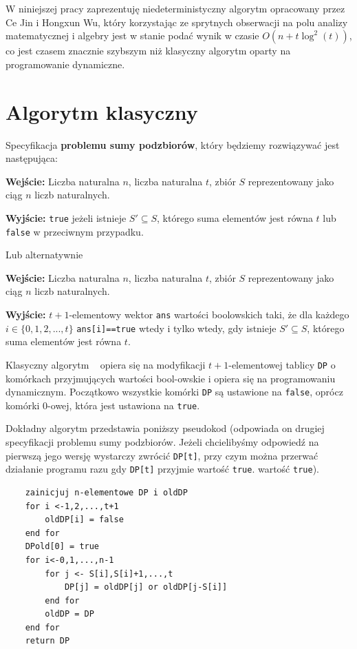 \documentclass{article}
\begin{document}
W niniejszej pracy zaprezentuję niedeterministyczny algorytm opracowany przez Ce Jin 
i Hongxun Wu, który korzystając ze sprytnych obserwacji na polu analizy matematycznej i algebry jest w 
stanie podać wynik w czasie $O(n+t\log^2(t))$, co jest czasem znacznie szybszym niż klasyczny algorytm 
oparty na programowanie dynamiczne. 



\section{Algorytm klasyczny}
Specyfikacja \textbf{problemu sumy podzbiorów}, który będziemy rozwiązywać jest następująca:

\begin{tcolorbox}
    \textbf{Wejście:} Liczba naturalna $n$, liczba naturalna $t$, zbiór $S$ reprezentowany jako ciąg $n$ liczb naturalnych.
    
    \textbf{Wyjście:} \texttt{true} jeżeli istnieje $S' \subseteq S$, którego suma elementów jest równa $t$ lub 
    \texttt{false} w przeciwnym przypadku.
\end{tcolorbox}
Lub alternatywnie
\begin{tcolorbox}
    \textbf{Wejście:} Liczba naturalna $n$, liczba naturalna $t$, zbiór $S$ reprezentowany jako ciąg $n$ liczb naturalnych.
    
    \textbf{Wyjście:} $t+1$-elementowy wektor \texttt{ans} wartości boolowskich taki, że dla każdego
    $i \in \{0,1,2,...,t\}$ \texttt{ans[i]==true} wtedy i tylko wtedy, gdy
    istnieje $S' \subseteq S$, którego suma elementów jest równa $t$.
\end{tcolorbox}


Klasyczny algorytm ~\cite{martello1984mixture} opiera się na modyfikacji $t+1$-elementowej tablicy \texttt{DP} o komórkach przyjmujących wartości bool-owskie i 
opiera się na programowaniu dynamicznym. Początkowo wszystkie komórki \texttt{DP} są ustawione na \texttt{false}, oprócz komórki 
$0$-owej, która
jest ustawiona na \texttt{true}.

Dokładny algorytm przedstawia poniższy pseudokod (odpowiada on drugiej specyfikacji problemu sumy podzbiorów. Jeżeli chcielibyśmy
odpowiedź na pierwszą jego wersję wystarczy zwrócić \texttt{DP[t]}, przy czym można przerwać działanie programu razu gdy 
\texttt{DP[t]} przyjmie wartość \texttt{true}.
wartość \texttt{true}).
\begin{verbatim}
    zainicjuj n-elementowe DP i oldDP
    for i <-1,2,...,t+1
        oldDP[i] = false
    end for 
    DPold[0] = true
    for i<-0,1,...,n-1
        for j <- S[i],S[i]+1,...,t
            DP[j] = oldDP[j] or oldDP[j-S[i]]
        end for
        oldDP = DP
    end for
    return DP
\end{verbatim}
\end{document}
